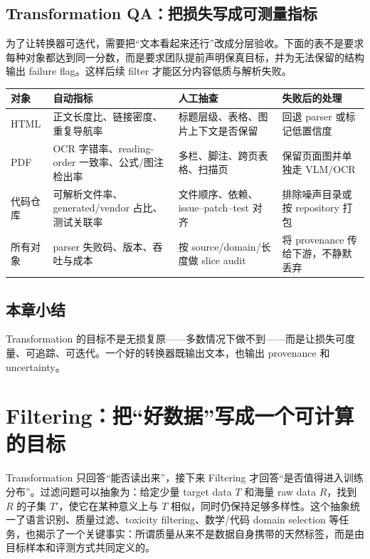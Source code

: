 \documentclass[a4paper]{article}
\begin{document}
\subsection{Transformation QA：把损失写成可测量指标}

为了让转换器可迭代，需要把“文本看起来还行”改成分层验收。下面的表不是要求每种对象都达到同一分数，而是要求团队提前声明保真目标，并为无法保留的结构输出 failure flag。这样后续 filter 才能区分内容低质与解析失败。

\begin{longtable}{L{0.17\textwidth}L{0.24\textwidth}L{0.24\textwidth}L{0.21\textwidth}}
\toprule
对象 & 自动指标 & 人工抽查 & 失败后的处理 \\
\midrule
HTML & 正文长度比、链接密度、重复导航率 & 标题层级、表格、图片上下文是否保留 & 回退 parser 或标记低置信度 \\
PDF & OCR 字错率、reading-order 一致率、公式/图注检出率 & 多栏、脚注、跨页表格、扫描页 & 保留页面图并单独走 VLM/OCR \\
代码仓库 & 可解析文件率、generated/vendor 占比、测试关联率 & 文件顺序、依赖、issue--patch--test 对齐 & 排除噪声目录或按 repository 打包 \\
所有对象 & parser 失败码、版本、吞吐与成本 & 按 source/domain/长度做 slice audit & 将 provenance 传给下游，不静默丢弃 \\
\bottomrule
\end{longtable}

\subsection{本章小结}

Transformation 的目标不是无损复原——多数情况下做不到——而是让损失可度量、可追踪、可迭代。一个好的转换器既输出文本，也输出 provenance 和 uncertainty。

\section{Filtering：把“好数据”写成一个可计算的目标}

Transformation 只回答“能否读出来”，接下来 Filtering 才回答“是否值得进入训练分布”。过滤问题可以抽象为：给定少量 target data $T$ 和海量 raw data $R$，找到 $R$ 的子集 $T'$，使它在某种意义上与 $T$ 相似，同时仍保持足够多样性。这个抽象统一了语言识别、质量过滤、toxicity filtering、数学/代码 domain selection 等任务，也揭示了一个关键事实：所谓质量从来不是数据自身携带的天然标签，而是由目标样本和评测方式共同定义的。
\end{document}

